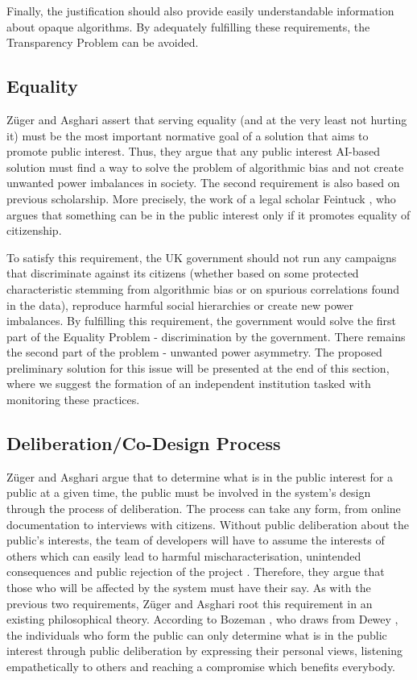 \documentclass[preprint]{acmart}
\begin{document}
Finally, the justification should also provide easily understandable information about opaque algorithms. By adequately fulfilling these requirements, the Transparency Problem can be avoided.


\subsection{Equality}

Züger and Asghari \cite{zuger2022} assert that serving equality (and at the very least not hurting it) must be the most important normative goal of a solution that aims to promote public interest. Thus, they argue that any public interest AI-based solution must find a way to solve the problem of algorithmic bias and not create unwanted power imbalances in society. The second requirement is also based on previous scholarship. More precisely, the work of a legal scholar Feintuck \cite{feintuck2004}, who argues that something can be in the public interest only if it promotes equality of citizenship. 



To satisfy this requirement, the UK government should not run any campaigns that discriminate against its citizens (whether based on some protected characteristic stemming from algorithmic bias or on spurious correlations found in the data), reproduce harmful social hierarchies or create new power imbalances. By fulfilling this requirement, the government would solve the first part of the Equality Problem - discrimination by the government. There remains the second part of the problem - unwanted power asymmetry. The proposed preliminary solution for this issue will be presented at the end of this section, where we suggest the formation of an independent institution tasked with monitoring these practices.



\subsection{Deliberation/Co-Design Process}

Züger and Asghari \cite{zuger2022} argue that to determine what is in the public interest for a public at a given time, the public must be involved in the system's design through the process of deliberation. The process can take any form, from online documentation to interviews with citizens. Without public deliberation about the public's interests, the team of developers will have to assume the interests of others which can easily lead to harmful mischaracterisation, unintended consequences and public rejection of the project \cite{zuger2022}. Therefore, they argue that those who will be affected by the system must have their say. As with the previous two requirements, Züger and Asghari root this requirement in an existing philosophical theory. According to Bozeman \cite{bozeman2007}, who draws from Dewey \cite{Dewey2012}, the individuals who form the public can only determine what is in the public interest through public deliberation by expressing their personal views, listening empathetically to others and reaching a compromise which benefits everybody. 
\end{document}
